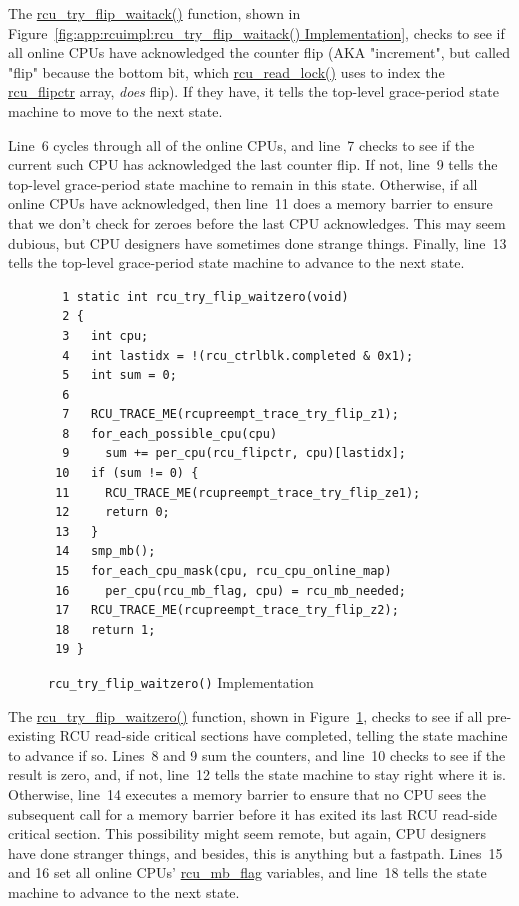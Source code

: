 The \url{rcu_try_flip_waitack()} function, shown in
Figure~\ref{fig:app:rcuimpl:rcu_try_flip_waitack() Implementation},
checks to see
if all online CPUs have acknowledged the counter flip (AKA "increment",
but called "flip" because the bottom bit, which \url{rcu_read_lock()}
uses to index the \url{rcu_flipctr} array, \emph{does} flip).
If they have, it tells the top-level grace-period state machine to
move to the next state.

Line~6 cycles through all of the online CPUs, and line~7
checks to see if the current such CPU has acknowledged the last counter
flip.
If not, line~9 tells the top-level grace-period state machine to
remain in this state.
Otherwise, if all online CPUs have acknowledged, then line~11
does a memory barrier to ensure that we don't check for zeroes before
the last CPU acknowledges.
This may seem dubious, but CPU designers have sometimes done strange
things.
Finally, line~13 tells the top-level grace-period state machine
to advance to the next state.

\begin{figure}[tbp]
{ \scriptsize
\begin{verbatim}
  1 static int rcu_try_flip_waitzero(void)
  2 {
  3   int cpu;
  4   int lastidx = !(rcu_ctrlblk.completed & 0x1);
  5   int sum = 0;
  6
  7   RCU_TRACE_ME(rcupreempt_trace_try_flip_z1);
  8   for_each_possible_cpu(cpu)
  9     sum += per_cpu(rcu_flipctr, cpu)[lastidx];
 10   if (sum != 0) {
 11     RCU_TRACE_ME(rcupreempt_trace_try_flip_ze1);
 12     return 0;
 13   }
 14   smp_mb();
 15   for_each_cpu_mask(cpu, rcu_cpu_online_map)
 16     per_cpu(rcu_mb_flag, cpu) = rcu_mb_needed;
 17   RCU_TRACE_ME(rcupreempt_trace_try_flip_z2);
 18   return 1;
 19 }
\end{verbatim}
}
\caption{{\tt rcu\_try\_flip\_waitzero()} Implementation}
\label{fig:app:rcuimpl:rcu_try_flip_waitzero() Implementation}
\end{figure}

The \url{rcu_try_flip_waitzero()} function, shown in
Figure~\ref{fig:app:rcuimpl:rcu_try_flip_waitzero() Implementation},
checks to see if
all pre-existing RCU read-side critical sections have completed,
telling the state machine to advance if so.
Lines~8 and 9 sum the counters, and line~10 checks
to see if the result is zero, and, if not, line~12 tells
the state machine to stay right where it is.
Otherwise, line~14 executes a memory barrier to ensure that
no CPU sees the subsequent call for a memory barrier before it
has exited its last RCU read-side critical section.
This possibility might seem remote, but again, CPU designers have
done stranger things, and besides, this is anything but a fastpath.
Lines~15 and 16 set all online CPUs' \url{rcu_mb_flag}
variables, and line~18 tells the state machine to advance to
the next state.

